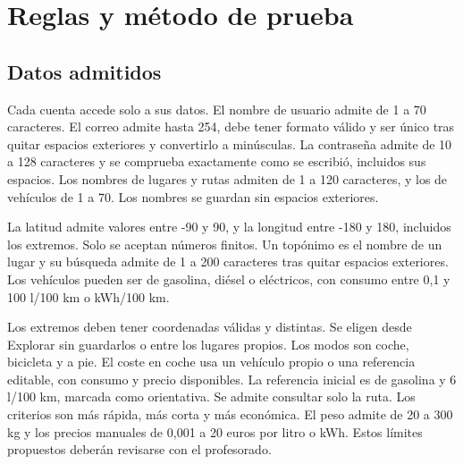 \clearpage\section{Reglas y método de prueba}\label{sec3}
\subsection*{Datos admitidos}
Cada cuenta accede solo a sus datos. El nombre de usuario admite de 1 a 70 caracteres. El correo admite hasta 254, debe tener formato válido y ser único tras quitar espacios exteriores y convertirlo a minúsculas. La contraseña admite de 10 a 128 caracteres y se comprueba exactamente como se escribió, incluidos sus espacios. Los nombres de lugares y rutas admiten de 1 a 120 caracteres, y los de vehículos de 1 a 70. Los nombres se guardan sin espacios exteriores.\par
La latitud admite valores entre -90 y 90, y la longitud entre -180 y 180, incluidos los extremos. Solo se aceptan números finitos. Un topónimo es el nombre de un lugar y su búsqueda admite de 1 a 200 caracteres tras quitar espacios exteriores. Los vehículos pueden ser de gasolina, diésel o eléctricos, con consumo entre 0,1 y 100 l/100 km o kWh/100 km.\par
Los extremos deben tener coordenadas válidas y distintas. Se eligen desde Explorar sin guardarlos o entre los lugares propios. Los modos son coche, bicicleta y a pie. El coste en coche usa un vehículo propio o una referencia editable, con consumo y precio disponibles. La referencia inicial es de gasolina y 6 l/100 km, marcada como orientativa. Se admite consultar solo la ruta. Los criterios son más rápida, más corta y más económica. El peso admite de 20 a 300 kg y los precios manuales de 0,001 a 20 euros por litro o kWh. Estos límites propuestos deberán revisarse con el profesorado.\par
